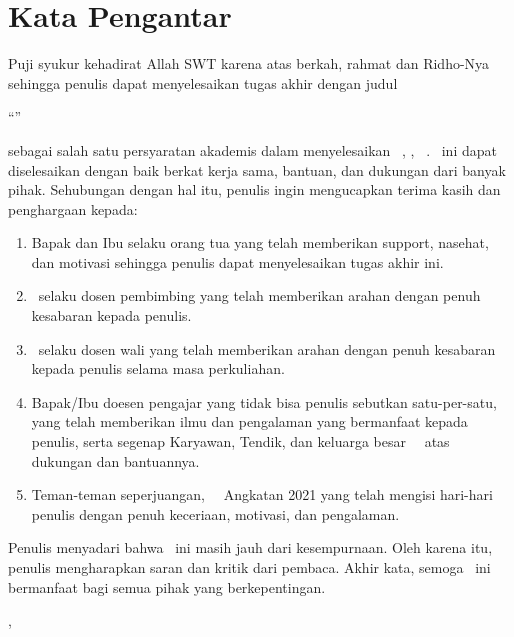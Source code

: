 \chapter*{Kata Pengantar}

Puji syukur kehadirat Allah SWT karena atas berkah, rahmat dan Ridho-Nya sehingga penulis dapat menyelesaikan tugas akhir dengan judul
\begin{center}
	\begin{minipage}{0.9\linewidth}
		\centering
		``\MakeUppercase{\titleBahasa}''
	\end{minipage}
\end{center}
sebagai salah satu persyaratan akademis dalam menyelesaikan \degreeLevelBahasa\ \departmentNameBahasa, \facultyNameBahasa, \campusName\ \theCity. \documentNameBahasa\ ini dapat diselesaikan dengan baik berkat kerja sama, bantuan, dan dukungan dari banyak pihak. Sehubungan dengan hal itu, penulis ingin mengucapkan terima kasih dan penghargaan kepada:
\begin{enumerate}
	\item Bapak dan Ibu selaku orang tua yang telah memberikan support, nasehat, dan motivasi sehingga penulis dapat menyelesaikan tugas akhir ini.

	\item \supervisor\ selaku dosen pembimbing yang telah memberikan arahan dengan penuh kesabaran kepada penulis.

	\item \academicAdvisor\ selaku dosen wali yang telah memberikan arahan dengan penuh kesabaran kepada penulis selama masa perkuliahan.

	\item Bapak/Ibu doesen pengajar yang tidak bisa penulis sebutkan satu-per-satu, yang telah memberikan ilmu dan pengalaman yang bermanfaat kepada penulis, serta segenap Karyawan, Tendik, dan keluarga besar \departmentNameBahasa\ \campusName\ atas dukungan dan bantuannya.

	\item Teman-teman seperjuangan, \departmentNameHeadlessBahasa\ \campusName\ Angkatan 2021 yang telah mengisi hari-hari penulis dengan penuh keceriaan, motivasi, dan pengalaman.
\end{enumerate}

Penulis menyadari bahwa \MakeTextLowercase{\documentNameBahasa}\ ini masih jauh dari kesempurnaan. Oleh karena itu, penulis mengharapkan saran dan kritik dari pembaca. Akhir kata, semoga \documentNameBahasa\ ini bermanfaat bagi semua pihak yang berkepentingan.

\vspace{2em}

\begin{flushright}
	\theCity, \theMonth\ \theYear

	\vspace{4em}

	\theAuthor
\end{flushright}
